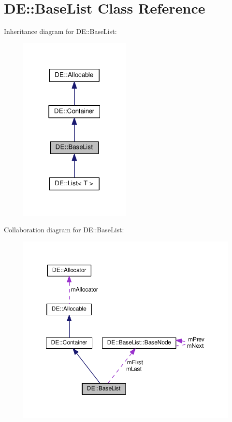 \hypertarget{classDE_1_1BaseList}{}\section{DE\+:\+:Base\+List Class Reference}
\label{classDE_1_1BaseList}


Inheritance diagram for DE\+:\+:Base\+List\+:\nopagebreak
\begin{figure}[H]
\begin{center}
\leavevmode
\includegraphics[width=159pt]{classDE_1_1BaseList__inherit__graph}
\end{center}
\end{figure}


Collaboration diagram for DE\+:\+:Base\+List\+:\nopagebreak
\begin{figure}[H]
\begin{center}
\leavevmode
\includegraphics[width=350pt]{classDE_1_1BaseList__coll__graph}
\end{center}
\end{figure}
